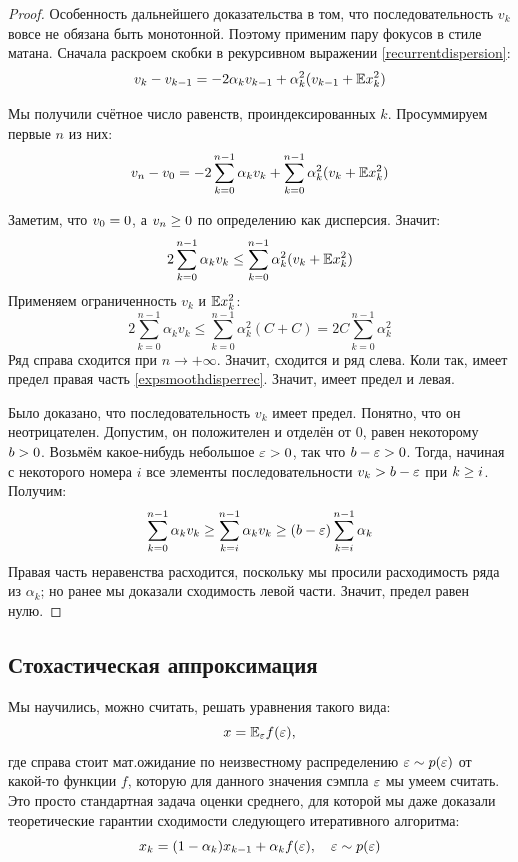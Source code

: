 \begin{theoremBox}[label=th:expsmoothingconvergence]{}
\begin{proof}
Особенность дальнейшего доказательства в том, что последовательность $v_k$ вовсе не обязана быть монотонной. Поэтому применим пару фокусов в стиле матана. Сначала раскроем скобки в рекурсивном выражении \eqref{recurrentdispersion}:
$$v_{k} - v_{k-1} = - 2\alpha_k v_{k-1} + \alpha_k^2 (v_{k-1} + \mathbb{E} x_k^2)$$

Мы получили счётное число равенств, проиндексированных $k$. Просуммируем первые $n$ из них:
\begin{equation}\label{expsmoothdisperrec}
v_{n} - v_0 = - 2 \sum_{k = 0}^{n-1} \alpha_k v_k + \sum_{k = 0}^{n-1} \alpha_k^2 (v_k + \mathbb{E} x_k^2)
\end{equation}

Заметим, что $v_0 \HM= 0$, а $v_{n} \HM\ge 0$ по определению как дисперсия. Значит: 
$$2 \sum_{k = 0}^{n-1} \alpha_k v_k \le \sum_{k = 0}^{n-1} \alpha_k^2 (v_k + \mathbb{E} x_k^2)$$
Применяем ограниченность $v_k$ и $\mathbb{E} x_k^2$:
$$2 \sum_{k = 0}^{n-1} \alpha_k v_k \le \sum_{k = 0}^{n-1} \alpha_k^2 (C + C) = 2C \sum_{k = 0}^{n-1} \alpha_k^2$$
Ряд справа сходится при $n \to +\infty$. Значит, сходится и ряд слева. Коли так, имеет предел правая часть \eqref{expsmoothdisperrec}. Значит, имеет предел и левая.

Было доказано, что последовательность $v_k$ имеет предел. Понятно, что он неотрицателен. Допустим, он положителен и отделён от 0, равен некоторому $b \HM> 0$. Возьмём какое-нибудь небольшое $\eps \HM> 0$, так что $b \HM- \eps \HM> 0$. Тогда, начиная с некоторого номера $i$ все элементы последовательности $v_k \HM> b \HM- \eps$ при $k \HM\ge i$. Получим:
$$\sum_{k = 0}^{n-1} \alpha_k v_k \ge \sum_{k = i}^{n-1} \alpha_k v_k \ge (b - \varepsilon) \sum_{k = i}^{n-1} \alpha_k$$
Правая часть неравенства расходится, поскольку мы просили расходимость ряда из $\alpha_k$; но ранее мы доказали сходимость левой части. Значит, предел равен нулю.
\end{proof}
\end{theoremBox}

\subsection{Стохастическая аппроксимация}

Мы научились, можно считать, решать уравнения такого вида:
$$x = \mathbb{E}_{\varepsilon} f(\varepsilon),$$
где справа стоит мат.ожидание по неизвестному распределению $\varepsilon \sim p(\varepsilon)$ от какой-то функции $f$, которую для данного значения сэмпла $\varepsilon$ мы умеем считать. Это просто стандартная задача оценки среднего, для которой мы даже доказали теоретические гарантии сходимости следующего итеративного алгоритма:
$$x_k = (1 - \alpha_k)x_{k-1} + \alpha_k f(\varepsilon), \quad \varepsilon \sim p(\varepsilon)$$


